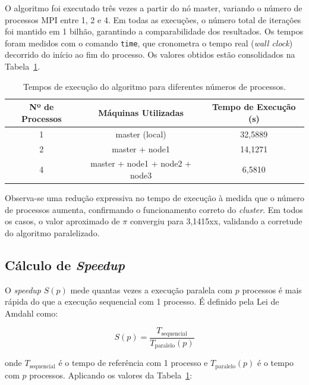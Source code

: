 \documentclass[
	12pt,
	oneside,
	a4paper,
	chapter=TITLE,
	section=TITLE,
	english,
	brazil,
	sumario=tradicional
]{abntex2}
\begin{document}
O algoritmo foi executado três vezes a partir do nó master, variando
o número de processos MPI entre 1, 2 e 4. Em todas as execuções,
o número total de iterações foi mantido em 1 bilhão, garantindo a
comparabilidade dos resultados. Os tempos foram medidos com o
comando \texttt{time}, que cronometra o tempo real (\textit{wall
clock}) decorrido do início ao fim do processo. Os valores
obtidos estão consolidados na Tabela~\ref{tab:tempos_execucao}.

\begin{table}[htb]
    \centering
    \begin{tabular}{|c|c|c|}
        \hline
        \rowcolor{gray!25} 
        \textbf{Nº de Processos} & \textbf{Máquinas Utilizadas} & \textbf{Tempo de Execução (s)}  \\ 
        \hline
        1  & master (local) & 32,5889 \\
        \hline
        2  & master + node1 & 14,1271 \\
        \hline
        4  & master + node1 + node2 + node3 & 6,5810  \\
        \hline
    \end{tabular}
    \caption{Tempos de execução do algoritmo para
           diferentes números de processos.}
    \label{tab:tempos_execucao}
\end{table}
 
Observa-se uma redução expressiva no tempo de execução à medida
que o número de processos aumenta, confirmando o funcionamento
correto do \textit{cluster}. Em todos os casos, o valor aproximado de
$\pi$ convergiu para 3,1415xx, validando a corretude
do algoritmo paralelizado.

\subsection{Cálculo de \textit{Speedup}}

O \textit{speedup} $S(p)$ mede quantas vezes a execução paralela
com $p$ processos é mais rápida do que a execução sequencial
com 1 processo. É definido pela Lei de Amdahl como:
 
\begin{equation}
  S(p) = \frac{T_{\text{sequencial}}}{T_{\text{paralelo}}(p)}
  \label{eq:speedup}
\end{equation}
 
\noindent onde $T_{\text{sequencial}}$ é o tempo de referência
com 1 processo e $T_{\text{paralelo}}(p)$ é o tempo com $p$
processos. Aplicando os valores da Tabela~\ref{tab:tempos_execucao}:
 
\end{document}
